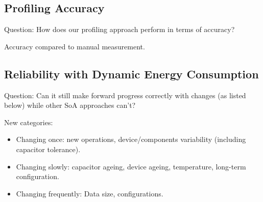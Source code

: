 

\subsection{Profiling Accuracy}

Question: How does our profiling approach perform in terms of accuracy?

Accuracy compared to manual measurement.



% 
% 





\subsection{Reliability with Dynamic Energy Consumption}

Question: Can it still make forward progress correctly with changes (as listed below) while other SoA approaches can't? 

New categories:

\begin{itemize}
    \item Changing once: new operations, device/components variability (including capacitor tolerance).
    \item Changing slowly: capacitor ageing, device ageing, temperature, long-term configuration.
    \item Changing frequently: Data size, configurations. 
\end{itemize}

